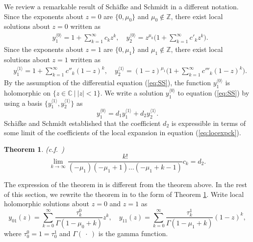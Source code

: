 \documentclass[12pt]{amsart}
\newcommand{\Zint}{\mathbb {Z}}
\newcommand{\C}{\mathbb {C}}     %
\numberwithin{equation}{section}
\newtheorem{thm}{Theorem}[section]
\theoremstyle{definition}
\theoremstyle{remark}
\begin{document}
We review a remarkable result of Sch{\"a}fke and Schmidt in a different notation.
Since the exponents about $z=0$ are $\{0 , \mu _0 \} $ and $\mu _0 \not \in \Zint $, there exist local solutions about $z=0$ written as 
\begin{align}
& y^{\langle 0 \rangle} _1  = 1 + \sum _{k=1}^{\infty } c_k  z^k  ,  \quad  y^{\langle 0 \rangle} _2  = z^{\mu _0} \Big( 1 +\sum _{k=1}^{\infty } c' _k z^k  \Big) . \label{eq:locexpck} 
\end{align}
Since the exponents about $z=1$ are $\{0 , \mu _1 \} $ and $\mu _1 \not \in \Zint $, there exist local solutions about $z=1$ written as 
\begin{align}
& y^{\langle 1 \rangle} _1  =  1+ \sum _{k=1}^{\infty } c '' _k (1-z)^k ,  \quad y^{\langle 1 \rangle} _2  = (1-z)^{\mu _1} \Big( 1 +\sum _{k=1}^{\infty } c''' _k (1-z)^k  \Big) . 
\end{align}
By the assumption of the differential equation (\ref{eq:SS}), the function $ y^{\langle 0 \rangle} _1 $ is holomorphic on $\{ z \in \C \: | \: |z|<1 \} $.
We write a solution $ y^{\langle 0 \rangle} _1$ to equation (\ref{eq:SS}) by using a basis $\{  y^{\langle 1 \rangle} _1  , y^{\langle 1 \rangle} _2  \} $ as  
\begin{equation}
 y^{\langle 0 \rangle} _1 = d_{1}  y^{\langle 1 \rangle} _1  + d_2 y^{\langle 1 \rangle} _2 .
\label{eq:y0d1d2}
\end{equation}
Sch{\"a}fke and Schmidt established that the coefficient $d_2$ is expressible in terms of some limit of the coefficients of the local expansion in equation (\ref{eq:locexpck}).
\begin{thm} \label{thm:SS} (c.f.~\cite[Theorem 2.15]{SS})
\begin{equation}
\lim _{k \to \infty} \frac{ k! }{ (-\mu_1) (-\mu_1 +1) \dots (-\mu _1 +k -1)} c_k = d_2 .
\label{eq:limkckd2}
\end{equation}
\end{thm}
The expression of the theorem in \cite[Theorem 2.15]{SS} is different from the theorem above.
In the rest of this section, we rewrite the theorem in \cite[Theorem 2.15]{SS} to the form of Theorem \ref{thm:SS}.
Write local holomorphic solutions about $z=0$ and $z=1$ as
\begin{equation}
y_{01} (z) = \sum _{k=0}^{\infty } \frac{\tau ^0 _k }{\Gamma (1- \mu _0+k)} z^k , \quad  y_{11} (z) = \sum _{k=0}^{\infty } \frac{\tau ^1 _k }{\Gamma (1- \mu _1+k)} (1-z)^k ,
\end{equation}
where $\tau ^0 _0 = 1 = \tau ^1 _0$ and $\Gamma ( \: \cdot \:  ) $ is the gamma function.
\end{document}
